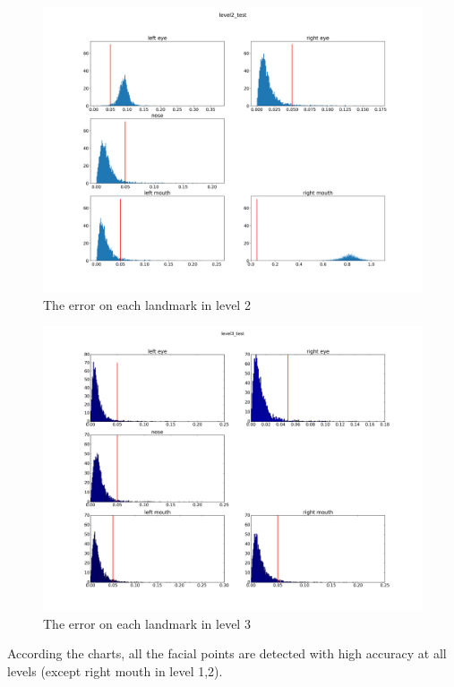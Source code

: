 \begin{figure}[h]
	\centering
	\includegraphics[scale=0.3]{images/level2_test}
	\caption{The error on each landmark in level 2}
	\label{1Fconv}
\end{figure}
\begin{figure}[h]
	\centering
	\includegraphics[scale=0.3]{images/level3_test}
	\caption{The error on each landmark in level 3}
	\label{1Fconv}
\end{figure}
According the charts, all the facial points are detected with high accuracy at all levels (except right mouth in level 1,2).
